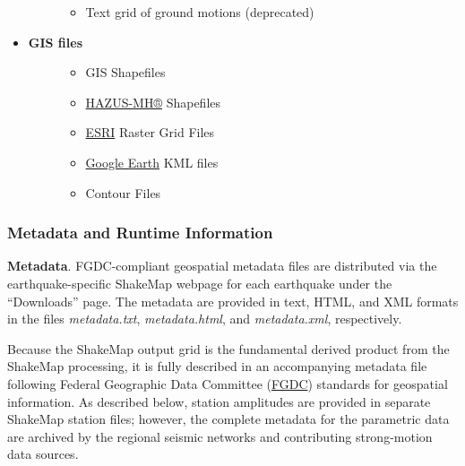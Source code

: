 \documentclass[letterpaper,10pt,english]{sphinxmanual}
\begin{document}
\begin{itemize}
\begin{description}
\begin{itemize}
\item {} 
Text grid of ground motions (deprecated)

\end{itemize}

\end{description}

\item {} \begin{description}
\item[{\textbf{GIS files}}] \leavevmode\begin{itemize}
\item {} 
GIS Shapefiles

\item {} 
\href{http://www.fema.gov/hazus/}{HAZUS-MH®} Shapefiles

\item {} 
\href{http://www.esri.com}{ESRI} Raster Grid Files

\item {} 
\href{http://earth.google.com}{Google Earth} KML files

\item {} 
Contour Files

\end{itemize}

\end{description}

\end{itemize}


\subsubsection{Metadata and Runtime Information}
\label{products:metadata-and-runtime-information}
\textbf{Metadata}. FGDC-compliant geospatial metadata files are distributed via the
earthquake-specific ShakeMap webpage for each earthquake under the “Downloads”
page. The metadata are provided in text, HTML, and XML formats in the files
\emph{metadata.txt}, \emph{metadata.html}, and \emph{metadata.xml}, respectively.

Because the ShakeMap output grid is the fundamental derived product from the ShakeMap
processing, it is fully described in an accompanying metadata file following
Federal Geographic Data Committee (\href{https://www.fgdc.gov/}{FGDC}) standards
for geospatial information.  As described below, station amplitudes are provided
in separate ShakeMap station files; however, the complete metadata for the parametric data are
archived by the regional seismic networks and contributing strong-motion data
sources.
\end{document}
